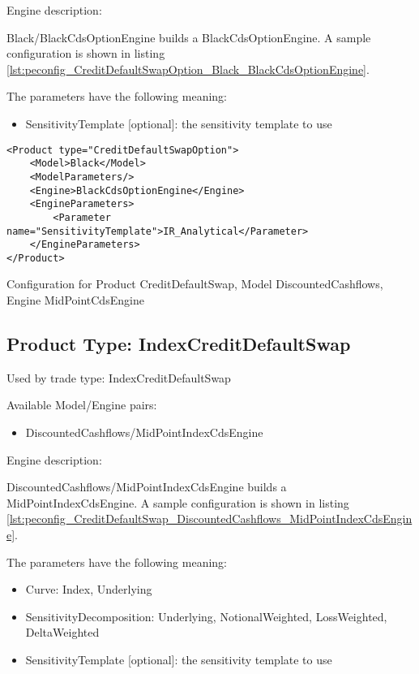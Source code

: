 Engine description:

Black/BlackCdsOptionEngine builds a BlackCdsOptionEngine. A sample configuration is shown in listing
\ref{lst:peconfig_CreditDefaultSwapOption_Black_BlackCdsOptionEngine}.

The parameters have the following meaning:

\begin{itemize}
\item SensitivityTemplate [optional]: the sensitivity template to use 
\end{itemize}

\begin{longlisting}
\begin{verbatim}
<Product type="CreditDefaultSwapOption">
    <Model>Black</Model>
    <ModelParameters/>
    <Engine>BlackCdsOptionEngine</Engine>
    <EngineParameters>
        <Parameter name="SensitivityTemplate">IR_Analytical</Parameter>
    </EngineParameters>
</Product>
\end{verbatim}
\caption{Configuration for Product CreditDefaultSwap, Model DiscountedCashflows, Engine MidPointCdsEngine}
\label{lst:peconfig_CreditDefaultSwapOption_Black_BlackCdsOptionEngine}
\end{longlisting}

\subsection{Product Type: IndexCreditDefaultSwap}

Used by trade type: IndexCreditDefaultSwap

Available Model/Engine pairs:

\begin{itemize}
\item DiscountedCashflows/MidPointIndexCdsEngine
\end{itemize}

Engine description:

DiscountedCashflows/MidPointIndexCdsEngine builds a MidPointIndexCdsEngine. A sample configuration is shown in listing
\ref{lst:peconfig_CreditDefaultSwap_DiscountedCashflows_MidPointIndexCdsEngine}.

The parameters have the following meaning:

\begin{itemize}
\item Curve: Index, Underlying
\item SensitivityDecomposition: Underlying, NotionalWeighted, LossWeighted, DeltaWeighted
\item SensitivityTemplate [optional]: the sensitivity template to use 
\end{itemize}

